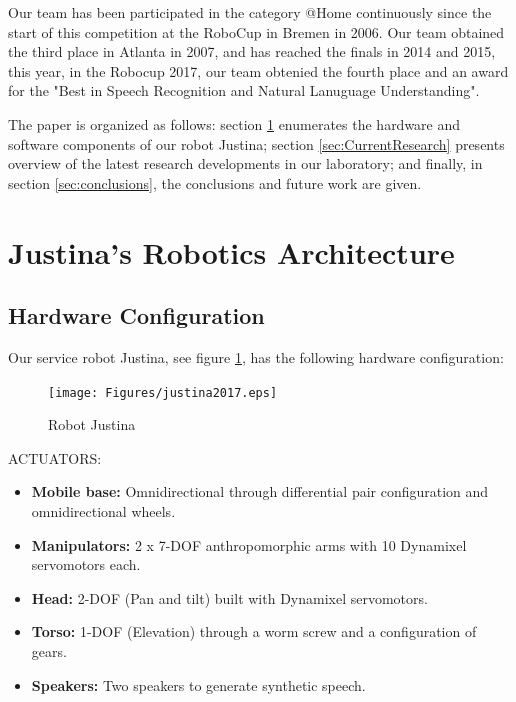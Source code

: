\documentclass{llncs}
\begin{document}
Our team has been participated in the category @Home continuously since the start of this competition at the
RoboCup in Bremen in 2006. Our team obtained the third place in Atlanta in 2007, and has reached the finals in 2014 and 2015, 
this year, in the Robocup 2017, our team obtenied the fourth place and an award for the "Best in Speech Recognition
and Natural Lanuguage Understanding".

The paper is organized as follows:
section \ref{sec:background} enumerates the hardware and software components of our robot
Justina; section \ref{sec:CurrentResearch}  presents overview of the latest research developments in our
laboratory; and finally, in section \ref{sec:conclusions}, the conclusions and future work are given.


\section{Justina's Robotics Architecture}\label{sec:background}
\subsection{Hardware Configuration}

Our service robot Justina, see figure \ref{fig:justina}, has the following hardware configuration:\\

\begin{figure}
	\texttt{[image: Figures/justina2017.eps]}
  \caption{Robot Justina}
  \label{fig:justina}
\end{figure}



ACTUATORS:

\begin{itemize}
	\item \textbf{Mobile base:} Omnidirectional through differential pair configuration and omnidirectional wheels. 
	\item \textbf{Manipulators:} 2 x 7-DOF anthropomorphic arms with 10 Dynamixel servomotors each.
	\item \textbf{Head:} 2-DOF (Pan and tilt) built with Dynamixel servomotors.
	\item \textbf{Torso:} 1-DOF (Elevation) through a worm screw and a configuration of gears. 
	\item \textbf{Speakers:} Two speakers to generate synthetic speech.
\end{itemize}
\end{document}
